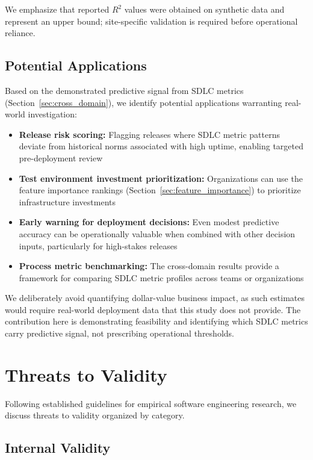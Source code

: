\documentclass[technologies,article,submit,pdftex,moreauthors]{Definitions/mdpi}
\begin{document}
We emphasize that reported \(R^2\) values were obtained on synthetic
data and represent an upper bound; site-specific validation is required
before operational reliance.

\subsection{Potential Applications}\label{sec:applications}

Based on the demonstrated predictive signal from SDLC metrics
(Section~\ref{sec:cross_domain}), we identify
potential applications warranting real-world investigation:

\begin{itemize}
\item
  \textbf{Release risk scoring:} Flagging releases where SDLC metric
  patterns deviate from historical norms associated with high uptime,
  enabling targeted pre-deployment review
\item
  \textbf{Test environment investment prioritization:} Organizations can
  use the feature importance rankings
  (Section~\ref{sec:feature_importance}) to prioritize
  infrastructure investments
\item
  \textbf{Early warning for deployment decisions:} Even modest
  predictive accuracy can be operationally valuable when combined with
  other decision inputs, particularly for high-stakes releases
\item
  \textbf{Process metric benchmarking:} The cross-domain results provide
  a framework for comparing SDLC metric profiles across teams or
  organizations
\end{itemize}

We deliberately avoid quantifying dollar-value business impact, as such
estimates would require real-world deployment data that this study does
not provide. The contribution here is demonstrating feasibility and
identifying which SDLC metrics carry predictive signal, not prescribing
operational thresholds.

\section{Threats to Validity}\label{sec:threats}

Following established guidelines for empirical software engineering
research, we discuss threats to validity organized by category.

\subsection{Internal Validity}\label{sec:internal_validity}
\end{document}
